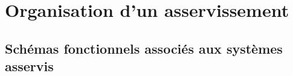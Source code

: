 


\clearpage
\section{Organisation d'un asservissement}

\subsection{Schémas fonctionnels associés aux systèmes asservis}

